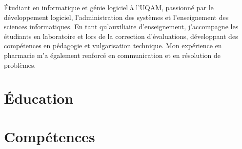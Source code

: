 \documentclass[letterpaper,10pt]{article}
\begin{document}


  Étudiant en informatique et génie logiciel à l’UQAM, passionné par le développement logiciel, l’administration des systèmes et l'enseignement des sciences informatiques. En tant qu’auxiliaire d’enseignement, j’accompagne les étudiants en laboratoire et lors de la correction d’évaluations, développant des compétences en pédagogie et vulgarisation technique. Mon expérience en pharmacie m’a également renforcé en communication et en résolution de problèmes.


  \section{Éducation}

  \vspace{10pt}
  

  \section{Compétences}
\end{document}
